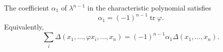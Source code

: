 The coefficient $\alpha_1$ of $\lambda^{n-1}$ in the characteristic polynomial satisfies
$$\alpha_1 = (-1)^{n-1} \operatorname{tr} \varphi.$$
Equivalently,
$$\sum_{i} \Delta(x_1, \ldots, \varphi x_i, \ldots, x_n) = (-1)^{n-1} \alpha_1 \Delta(x_1, \ldots, x_n).$$
